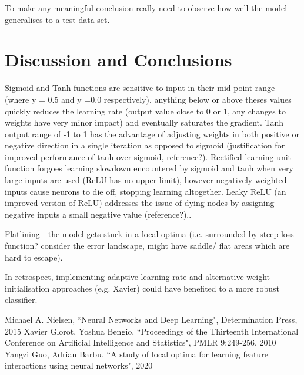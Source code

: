 \documentclass{article}
\begin{document}
To make any meaningful conclusion really need to observe how well the model generalises to a test data set.

\section{Discussion and Conclusions}
Sigmoid and Tanh functions are sensitive to input in their mid-point range (where y = 0.5 and y =0.0 respectively), anything below or above theses values quickly reduces the learning rate (output value close to 0 or 1, any changes to weights have very minor impact) and eventually saturates the gradient.
Tanh output range of -1 to 1 has the advantage of adjusting weights in both positive or negative direction in a single iteration as opposed to sigmoid (justification for improved performance of tanh over sigmoid, reference?).
Rectified learning unit function forgoes learning slowdown encountered by sigmoid and tanh when very large inputs are used (ReLU has no upper limit), however negatively weighted inputs cause neurons to die off, stopping learning altogether. Leaky ReLU (an improved version of ReLU) addresses the issue of dying nodes by assigning negative inputs a small negative value (reference?)..

Flatlining - the model gets stuck in a local optima (i.e. surrounded by steep loss function? consider the error landscape, might have saddle/ flat areas which are hard to escape).

In retrospect, implementing adaptive learning rate and alternative weight initialisation approaches (e.g. Xavier) could have benefited to a more robust classifier.

\begin{thebibliography}{10}
 Michael A. Nielsen, ``Neural Networks and Deep Learning", Determination Press, 2015
Xavier Glorot, Yoshua Bengio, ``Proceedings of the Thirteenth International Conference on Artificial Intelligence and Statistics", PMLR 9:249-256, 2010
  Yangzi Guo, Adrian Barbu, ``A study of local optima for learning feature interactions using neural networks", 2020

\end{thebibliography}
\end{document}
